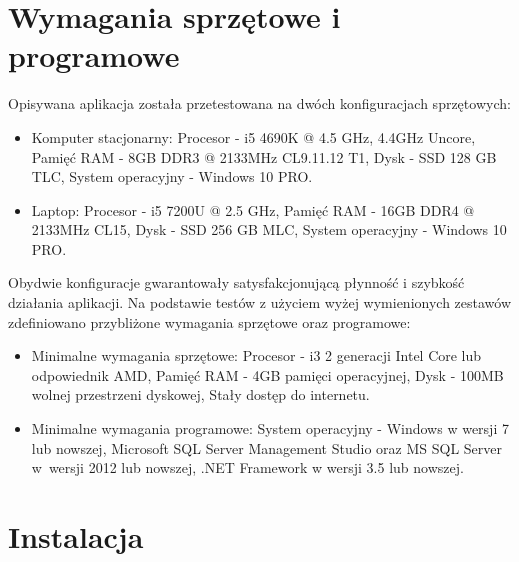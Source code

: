 \documentclass[a4paper]{book}
\begin{document}
\section{Wymagania sprzętowe i programowe}
Opisywana aplikacja została przetestowana na dwóch konfiguracjach sprzętowych:
 \begin{itemize}
	\item Komputer stacjonarny:
	\subitem Procesor - i5 4690K @ 4.5 GHz, 4.4GHz Uncore,
	\subitem Pamięć RAM - 8GB DDR3 @ 2133MHz CL9.11.12 T1,
	\subitem Dysk - SSD 128 GB TLC,
	\subitem System operacyjny - Windows 10 PRO.
	\item Laptop:
	\subitem Procesor - i5 7200U @ 2.5 GHz,
	\subitem Pamięć RAM - 16GB DDR4 @ 2133MHz CL15,
	\subitem Dysk - SSD 256 GB MLC,
	\subitem System operacyjny - Windows 10 PRO.
\end{itemize}
Obydwie konfiguracje gwarantowały satysfakcjonującą płynność i szybkość działania aplikacji.
Na podstawie testów z użyciem wyżej wymienionych zestawów zdefiniowano przybliżone wymagania sprzętowe oraz programowe:
\begin{itemize}
	\item Minimalne wymagania sprzętowe:
	\subitem Procesor - i3 2 generacji Intel Core lub odpowiednik AMD,
	\subitem Pamięć RAM - 4GB pamięci operacyjnej,
	\subitem Dysk - 100MB wolnej przestrzeni dyskowej,
	\subitem Stały dostęp do internetu.
	\item Minimalne wymagania programowe:
	\subitem System operacyjny - Windows w wersji 7 lub nowszej,
	\subitem Microsoft SQL Server Management Studio oraz MS SQL Server w~wersji 2012 lub nowszej,
	\subitem .NET Framework w wersji 3.5 lub nowszej.
\end{itemize}
\section{Instalacja}
\end{document}
